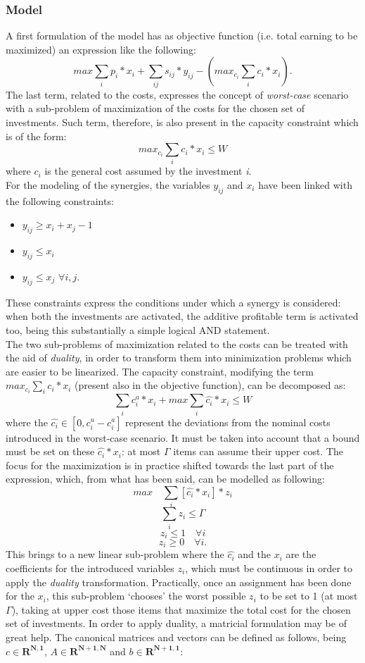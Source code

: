 \documentclass{article}
\begin{document}
\subsubsection*{Model}

A first formulation of the model has as objective function (i.e. total earning to be maximized) an expression like the following: \[ max \sum_i p_i * x_i + \sum_{ij} s_{ij} * y_{ij} - (max_{c_i} \sum_i c_i*x_i).\] The last term, related to the costs, expresses the concept of \textit{worst-case} scenario with a sub-problem of maximization of the costs for the chosen set of investments. Such term, therefore, is also present in the capacity constraint which is of the form: \[max_{c_i} \sum_i c_i*x_i\leq W\] where $c_i$ is the general cost assumed by the investment \textit{i}.\\
For the modeling of the synergies, the variables $y_{ij}$ and $x_i$ have been linked with the following constraints:
\begin{itemize}
        \item $y_{ij} \geq x_i+x_j-1$
        \item $y_{ij} \leq x_i$
        \item $y_{ij} \leq x_j$ \space\space\space\space\space$\forall i,j$.
    \end{itemize}
    
These constraints express the conditions under which a synergy is considered: when both the investments are activated, the additive profitable term is activated too, being this substantially a simple logical AND statement. \\

The two sub-problems of maximization related to the costs can be treated with the aid of \textit{duality}, in order to transform them into minimization problems which are easier to be linearized. 
The capacity constraint, modifying the term $max_{c_i} \sum_i c_i*x_i$ (present also in the objective function), can be decomposed as:
\[ \sum_i c_i^a * x_i + max \sum_i \hat{c_i} * x_i \leq W\] 
where the $\hat{c_i} \in [0, c_i^u-c_i^a]$ represent the deviations from the nominal costs introduced in the worst-case scenario. It must be taken into account that a bound must be set on these $\hat{c_i}*x_i$: at most $\Gamma$ items can assume their upper cost.
The focus for the maximization is in practice shifted towards the last part of the expression, which, from what has been said, can be modelled as following:
\[ max \quad \sum_i [\hat{c_i}*x_i]*z_i \]
\[\sum_i z_i \leq \Gamma\]
\[ z_i \leq 1 \quad \forall i\]
\[ z_i \geq 0 \quad \forall i.\]
This brings to a new linear sub-problem where the $\hat{c_i}$ and the $x_i$ are the coefficients for the introduced variables $z_i$, which must be continuous in order to apply the \emph{duality} transformation. Practically, once an assignment has been done for the $x_i$, this sub-problem `chooses' the worst possible $z_i$ to be set to 1 (at most $\Gamma$), taking at upper cost those items that maximize the total cost for the chosen set of investments. In order to apply duality, a matricial formulation may be of great help. The canonical matrices and vectors can be defined as follows, being $c \in \mathbf{R^{N,1}}$, $A \in \mathbf{R^{N+1,N}}$ and $b \in \mathbf{R^{N+1,1}}$: 
\end{document}
